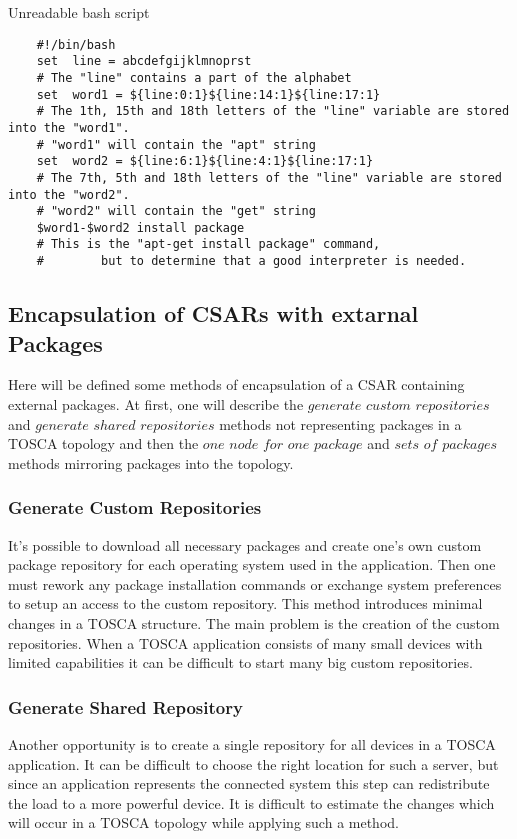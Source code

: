 \begin{Listing} 
	\caption{Unreadable bash script}
	\label{alg:unreadable}
	\begin{lstlisting}
	#!/bin/bash
	set  line = abcdefgijklmnoprst
	# The "line" contains a part of the alphabet
	set  word1 = ${line:0:1}${line:14:1}${line:17:1} 
	# The 1th, 15th and 18th letters of the "line" variable are stored into the "word1".
	# "word1" will contain the "apt" string 
	set  word2 = ${line:6:1}${line:4:1}${line:17:1}
	# The 7th, 5th and 18th letters of the "line" variable are stored into the "word2".
	# "word2" will contain the "get" string 
	$word1-$word2 install package
	# This is the "apt-get install package" command,
	#		 but to determine that a good interpreter is needed.
	\end{lstlisting}
\end{Listing}

\subsection*{Encapsulation of CSARs with extarnal Packages}\label{subs:encaps}
Here will be defined some methods of encapsulation of a CSAR containing external packages.
At first, one will describe the $generate$ $custom$ $repositories$ and $generate$ $shared$ $repositories$ methods not representing packages in a TOSCA topology and then the $one$ $node$ $for$ $one$ $package$ and $sets$ $of$ $packages$ methods mirroring packages into the topology.
\subsubsection*{Generate Custom Repositories}
It's possible to download all necessary packages and create one's own custom package repository for each operating system used in the application. 
Then one must rework any package installation commands or exchange system preferences to setup an access to the custom repository.
This method introduces minimal changes in a TOSCA structure.
The main problem is the creation of the custom repositories. 
When a TOSCA application consists of many small devices with limited capabilities it can be difficult to start many big custom repositories.
\subsubsection*{Generate Shared Repository}
Another opportunity is to create a single repository for all devices in a TOSCA application.
It can be difficult to choose the right location for such a server, but since an application represents the connected system this step can redistribute the load to a more powerful device.
It is difficult to estimate the changes which will occur in a TOSCA topology while applying such a method.
